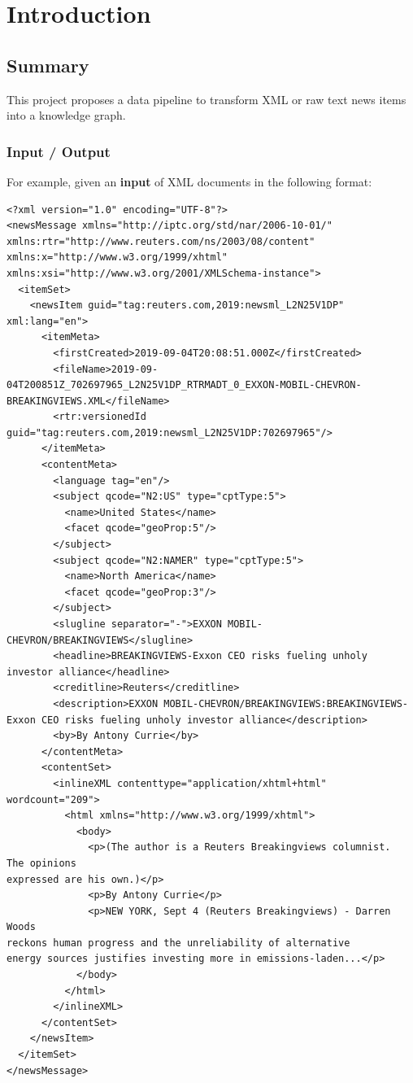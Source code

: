 \documentclass[11pt]{article}
\begin{document}
\newpage
\section{Introduction}
\subsection{Summary}
This project proposes a data pipeline to transform XML or raw text news items into a knowledge graph.

\subsubsection{Input / Output}
For example, given an \textbf{input} of XML documents in the following format:
\begin{lstlisting}[basicstyle=\tiny]
<?xml version="1.0" encoding="UTF-8"?>
<newsMessage xmlns="http://iptc.org/std/nar/2006-10-01/" xmlns:rtr="http://www.reuters.com/ns/2003/08/content" xmlns:x="http://www.w3.org/1999/xhtml" xmlns:xsi="http://www.w3.org/2001/XMLSchema-instance">
  <itemSet>
    <newsItem guid="tag:reuters.com,2019:newsml_L2N25V1DP" xml:lang="en">
      <itemMeta>
        <firstCreated>2019-09-04T20:08:51.000Z</firstCreated>
        <fileName>2019-09-04T200851Z_702697965_L2N25V1DP_RTRMADT_0_EXXON-MOBIL-CHEVRON-BREAKINGVIEWS.XML</fileName>
        <rtr:versionedId guid="tag:reuters.com,2019:newsml_L2N25V1DP:702697965"/>
      </itemMeta>
      <contentMeta>
        <language tag="en"/>
        <subject qcode="N2:US" type="cptType:5">
          <name>United States</name>
          <facet qcode="geoProp:5"/>
        </subject>
        <subject qcode="N2:NAMER" type="cptType:5">
          <name>North America</name>
          <facet qcode="geoProp:3"/>
        </subject>
        <slugline separator="-">EXXON MOBIL-CHEVRON/BREAKINGVIEWS</slugline>
        <headline>BREAKINGVIEWS-Exxon CEO risks fueling unholy investor alliance</headline>
        <creditline>Reuters</creditline>
        <description>EXXON MOBIL-CHEVRON/BREAKINGVIEWS:BREAKINGVIEWS-Exxon CEO risks fueling unholy investor alliance</description>
        <by>By Antony Currie</by>
      </contentMeta>
      <contentSet>
        <inlineXML contenttype="application/xhtml+html" wordcount="209">
          <html xmlns="http://www.w3.org/1999/xhtml">
            <body>
              <p>(The author is a Reuters Breakingviews columnist.  The opinions
expressed are his own.)</p>
              <p>By Antony Currie</p>
              <p>NEW YORK, Sept 4 (Reuters Breakingviews) - Darren Woods
reckons human progress and the unreliability of alternative
energy sources justifies investing more in emissions-laden...</p>
            </body>
          </html>
        </inlineXML>
      </contentSet>
    </newsItem>
  </itemSet>
</newsMessage>
\end{lstlisting}
\end{document}
